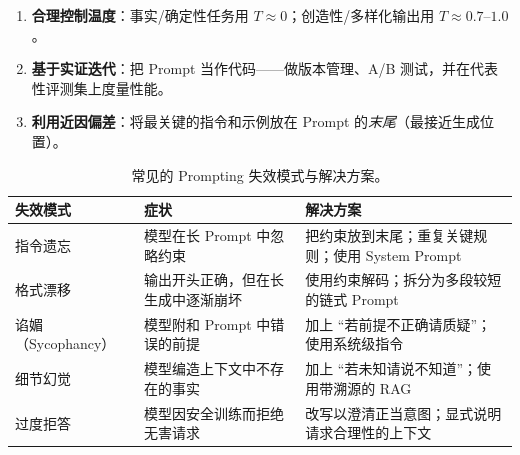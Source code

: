 \begin{keybox}[提示工程检查清单]
\begin{enumerate}
  \item \textbf{合理控制温度}：事实/确定性任务用 $T \approx 0$；创造性/多样化输出用 $T \approx 0.7$--$1.0$。
  \item \textbf{基于实证迭代}：把 Prompt 当作代码——做版本管理、A/B 测试，并在代表性评测集上度量性能。
  \item \textbf{利用近因偏差}：将最关键的指令和示例放在 Prompt 的\emph{末尾}（最接近生成位置）。
\end{enumerate}
\end{keybox}

\begin{table}[ht!]
\centering\small
\caption{常见的 Prompting 失效模式与解决方案。}
\noindent\begin{tabularx}{\linewidth}{@{}l Z{0.81} Z{1.19}@{}}
\toprule
\textbf{失效模式} & \textbf{症状} & \textbf{解决方案} \\
\midrule
指令遗忘 & 模型在长 Prompt 中忽略约束 & 把约束放到末尾；重复关键规则；使用 System Prompt \\
格式漂移 & 输出开头正确，但在长生成中逐渐崩坏 & 使用约束解码；拆分为多段较短的链式 Prompt \\
谄媚（Sycophancy） & 模型附和 Prompt 中错误的前提 & 加上 ``若前提不正确请质疑''；使用系统级指令 \\
细节幻觉 & 模型编造上下文中不存在的事实 & 加上 ``若未知请说不知道''；使用带溯源的 RAG \\
过度拒答 & 模型因安全训练而拒绝无害请求 & 改写以澄清正当意图；显式说明请求合理性的上下文 \\
\bottomrule
\end{tabularx}
\end{table}

